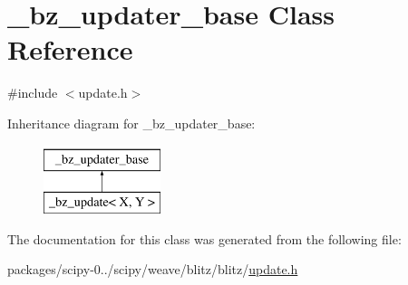 \hypertarget{class__bz__updater__base}{}\section{\+\_\+bz\+\_\+updater\+\_\+base Class Reference}
\label{class__bz__updater__base}


{\ttfamily \#include $<$update.\+h$>$}

Inheritance diagram for \+\_\+bz\+\_\+updater\+\_\+base\+:\begin{figure}[H]
\begin{center}
\leavevmode
\includegraphics[height=2.000000cm]{class__bz__updater__base}
\end{center}
\end{figure}


The documentation for this class was generated from the following file\+:\begin{DoxyCompactItemize}
\item 
packages/scipy-\/0../scipy/weave/blitz/blitz/\hyperlink{update_8h}{update.\+h}\end{DoxyCompactItemize}
